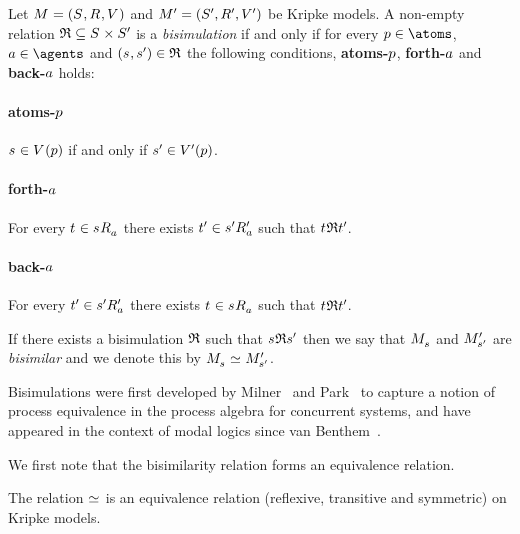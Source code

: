 \begin{definition}[Bisimulation]
Let $\kModelAndTuple$ and $\kModelAndTupleP$ be Kripke models.
A non-empty relation $\bisimulation \subseteq \kStates \times \kStatesP$ is a {\em bisimulation} if and only if for every $\atomP \in \atoms$, $\agentA \in \agents$ and $(\kStateS, \kStateSP) \in \bisimulation$ the following conditions, {\bf atoms-$p$}, {\bf forth-$a$} and {\bf back-$a$} holds:

\paragraph{atoms-$p$}
$\kStateS \in \kValuation(\atomP)$ if and only if ${{s}^{\prime}} \in {V^{\prime}}(p)$.

\paragraph{forth-$a$}
For every $\kStateT \in \kSuccessorsA{\kStateS}$ there exists ${{t}^{\prime}} \in {{{s}^{\prime}}} {R^{\prime}_{a}}$ such that $\kStateT \bisimulation \kStateTP$.

\paragraph{back-$a$}
For every ${{t}^{\prime}} \in {{{s}^{\prime}}} {R^{\prime}_{a}}$ there exists $\kStateT \in \kSuccessorsA{\kStateS}$ such that $\kStateT \bisimulation \kStateTP$.

If there exists a bisimulation $\mathfrak{R}$ such that $\kStateS \bisimulation \kStateSP$ then we say that $\kPModel{\kStateS}$ and ${M^{\prime}_{{{s}^{\prime}}}}$ are {\em bisimilar} and we denote this by $\kPModel{\kStateS} \bisimilar \kPModelP{\kStateSP}$.
\end{definition}

Bisimulations were first developed by Milner~\cite{milner:1980} and Park~\cite{park:1981} to capture a notion of process equivalence in the process algebra for concurrent systems, and have appeared in the context of modal logics since van Benthem~\cite{vanbenthem:1984}.

We first note that the bisimilarity relation forms an equivalence relation.

\begin{proposition}\label{bisimulation-equivalence-relation}
The relation $\bisimilar$ is an equivalence relation (reflexive, transitive and symmetric) on Kripke models.
\end{proposition}

